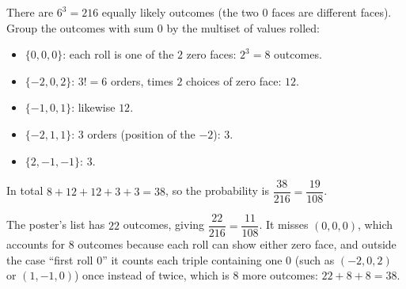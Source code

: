 There are $6^3=216$ equally likely outcomes (the two $0$ faces are different faces). Group the outcomes with sum $0$ by the multiset of values rolled:
\begin{itemize}
\item $\{0,0,0\}$: each roll is one of the $2$ zero faces: $2^3=8$ outcomes.
\item $\{-2,0,2\}$: $3!=6$ orders, times $2$ choices of zero face: $12$.
\item $\{-1,0,1\}$: likewise $12$.
\item $\{-2,1,1\}$: $3$ orders (position of the $-2$): $3$.
\item $\{2,-1,-1\}$: $3$.
\end{itemize}
In total $8+12+12+3+3=38$, so the probability is $\dfrac{38}{216}=\boxed{\dfrac{19}{108}}$.

The poster's list has $22$ outcomes, giving $\dfrac{22}{216}=\dfrac{11}{108}$. It misses $(0,0,0)$, which accounts for $8$ outcomes because each roll can show either zero face, and outside the case ``first roll $0$'' it counts each triple containing one $0$ (such as $(-2,0,2)$ or $(1,-1,0)$) once instead of twice, which is $8$ more outcomes: $22+8+8=38$.
